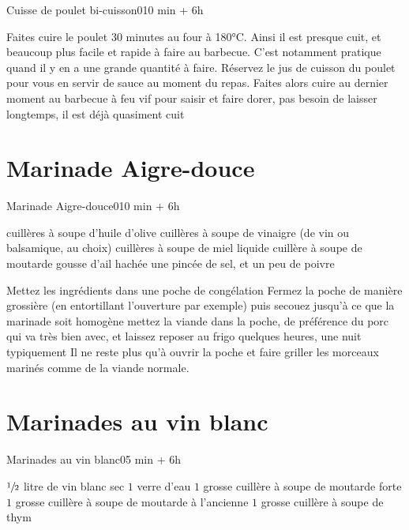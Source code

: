 {\begin{recette}{Cuisse de poulet bi-cuisson}{0}{10 min + 6h}{}
\begin{preparation}
\etape Faites cuire le poulet 30 minutes au four à 180°C. Ainsi il est presque cuit, et beaucoup plus facile et rapide à faire au barbecue. C'est notamment pratique quand il y en a une grande quantité à faire. 
\etape Réservez le jus de cuisson du poulet pour vous en servir de sauce au moment du repas.
\etape Faites alors cuire au dernier moment au barbecue à feu vif pour saisir et faire dorer, pas besoin de laisser longtemps, il est déjà quasiment cuit
\etape 
\end{preparation}
\end{recette}

\section{Marinade Aigre-douce}
\begin{recette}{Marinade Aigre-douce}{0}{10 min + 6h}{}
\begin{ingredients}
 cuillères à soupe d'huile d'olive
 cuillères à soupe de vinaigre (de vin ou balsamique, au choix)
 cuillères à soupe de miel liquide
 cuillère à soupe de moutarde
 gousse d'ail hachée
\ingredient une pincée de sel, et un peu de poivre
\end{ingredients}

\begin{preparation}
\etape Mettez les ingrédients dans une poche de congélation
\etape Fermez la poche de manière grossière (en entortillant l'ouverture par exemple) puis secouez jusqu'à ce que la marinade 
soit homogène
\etape mettez la viande dans la poche, de préférence du porc qui va très bien avec, et laissez reposer au frigo quelques heures, 
une nuit typiquement
\etape Il ne reste plus qu'à ouvrir la poche et faire griller les morceaux marinés comme de la viande normale.
\end{preparation}
\end{recette}

\section{Marinades au vin blanc}
\begin{recette}{Marinades au vin blanc}{0}{5 min + 6h}{}
\begin{ingredients}
\ingredient $\sfrac{1}{2}$ litre de vin blanc sec
\ingredient $1$ verre d'eau
\ingredient $1$ grosse cuillère à soupe de moutarde forte
\ingredient $1$ grosse cuillère à soupe de moutarde à l'ancienne
\ingredient $1$ grosse cuillère à soupe de thym
\end{ingredients}


\end{recette}}
